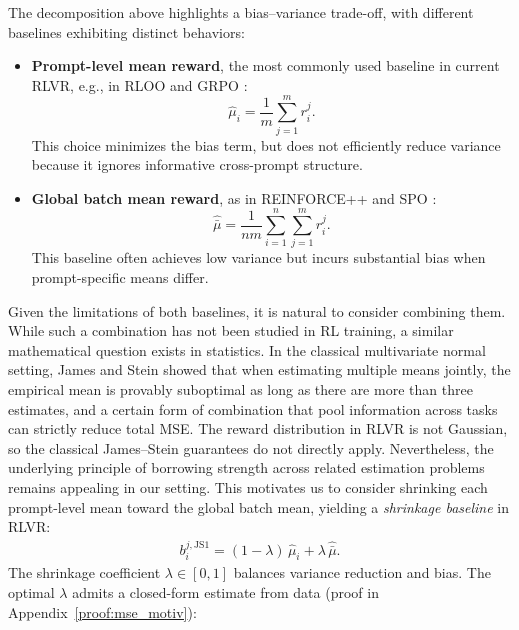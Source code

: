 \documentclass{article}
\theoremstyle{plain}
\theoremstyle{definition}
\theoremstyle{remark}
\begin{document}
The decomposition above highlights a bias–variance trade-off, with different baselines exhibiting distinct behaviors:
\begin{itemize}[leftmargin=*]
  \item \textbf{Prompt-level mean reward}, the most commonly used baseline in current RLVR, e.g., in RLOO \citep{ahmadian2024back} and GRPO \citep{guo2025deepseek}:
  \begin{equation}
    \label{eq:prompt_mean}
    \boxed{\hat \mu_i = \frac{1}{m}\sum_{j=1}^m r_i^j.}
  \end{equation}
  This choice minimizes the bias term, but does not efficiently reduce variance because it ignores informative cross-prompt structure.
  
  \item \textbf{Global batch mean reward}, as in REINFORCE++ \citep{hu2025reinforce++} and SPO \citep{xu2025single}:
  \begin{equation}
    \label{eq:global_mean}
    \boxed{\hat{\bar\mu} = \frac{1}{nm}\sum_{i=1}^n \sum_{j=1}^m r_i^j.}
  \end{equation}
  This baseline often achieves low variance but incurs substantial bias when prompt-specific means differ.
\end{itemize}
Given the limitations of both baselines, it is natural to consider combining them. While such a combination has not been studied in RL training, a similar mathematical question exists in statistics. In the classical multivariate normal setting, James \citep{james1961estimation} and Stein \citep{stein1956inadmissibility} showed that when estimating multiple means jointly, the empirical mean is provably suboptimal as long as there are more than three estimates, and a certain form of combination that pool information across tasks can strictly reduce total MSE. The reward distribution in RLVR is not Gaussian, so the classical James--Stein guarantees do not directly apply. Nevertheless, the underlying principle of borrowing strength across related estimation problems remains appealing in our setting. This motivates us to consider shrinking each prompt-level mean toward the global batch mean, yielding a \emph{shrinkage baseline} in RLVR:
\begin{align}
\label{eqn:JSnaive}
  \boxed{b_i^{j,\mathrm{JS1}}
  = (1-\lambda)\,\hat\mu_i + \lambda\,\hat{\bar\mu}.}
\end{align}
  The shrinkage coefficient $\lambda\in[0,1]$ balances variance reduction and bias.
  The optimal $\lambda$ admits a closed-form estimate from data (proof in Appendix~\ref{proof:mse_motiv}):
\end{document}
